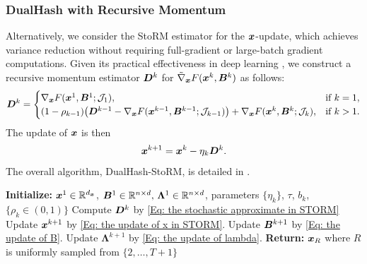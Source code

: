\subsubsection{DualHash with Recursive Momentum}
Alternatively, we consider the StoRM estimator \cite{cutkoskyMomentumBasedVarianceReduction2019} for the $\bm{x}$-update, which achieves variance reduction without requiring full-gradient or large-batch gradient computations. Given its practical effectiveness in deep learning \cite{levy2021storm+}, we construct a recursive momentum estimator $\bm{D}^k$ for $\tilde{\nabla}_{\bm{x}} F(\bm{x}^k, \bm{B}^k)$ as follows:
{
\begin{align}
\label{Eq: the stochastic approximate in STORM}
\bm{D}^k =
\begin{cases} 
\nabla_{\bm{x}} F(\bm{x}^1, \bm{B}^1; \mathcal{J}_1), &\text{if }  k = 1, \\
(1 - \rho_{k-1}) \big( \bm{D}^{k-1} - \nabla_{\bm{x}} F(\bm{x}^{k-1}, \bm{B}^{k-1};\mathcal{J}_{k-1})\big)+\nabla_{\bm{x}} F(\bm{x}^k, \bm{B}^k; \mathcal{J}_k), & \text{if } k > 1.
\end{cases}
\end{align}}The update of $\bm{x}$ is then 
\begin{align}
\label{Eq: the update of x in STORM}
    \bm{x}^{k+1} = \bm{x}^k - \eta_k \bm{D}^k.
\end{align} The overall algorithm, DualHash-StoRM, is detailed in .
\begin{algorithm}[t]
\caption{DualHash-StoRM}
\label{alg:our_algorithm_storm}
\begin{algorithmic}[1]
\STATE  \textbf{Initialize:} $\bm{x}^1  \in \mathbb{R}^{d_{\bm{x}}}$, \( \bm{B}^1 \in \mathbb{R}^{n\times d},\, \bm{\Lambda}^1\in \mathbb{R}^{n\times d}\), parameters $\{\eta_k\} $, $\tau $, $b_k$, $\{\rho_k\in (0,1)\}$
\STATE Compute $\bm{D}^k$ by \eqref{Eq: the stochastic approximate in STORM}
\STATE Update $\bm{x}^{k+1}$ by \eqref{Eq: the update of x in STORM}.
\STATE Update $\bm{B}^{k+1}$ by \eqref{Eq: the update of B}.
\STATE Update $\bm{\Lambda}^{k+1}$ by \eqref{Eq: the update of lambda}.
\ENDFOR
\STATE \textbf{Return:} $\bm{x}_R$ where $R$ is uniformly sampled from $\{2, \ldots, T+1\}$
\end{algorithmic}
\end{algorithm}

